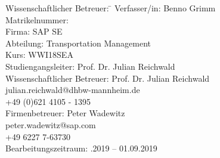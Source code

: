 \begin{titlepage}
\begin{center}
\begin{minipage}{\textwidth}
\begin{tabbing}
	Wissenschaftlicher Betreuer: \hspace{0.85cm}\=\kill
	Verfasser/in: \> Benno Grimm \\[1.5mm]
	Matrikelnummer:  \\[1.5mm]
	Firma: \> SAP SE  \\[1.5mm]
	Abteilung: \> Transportation Management \\[1.5mm]
	Kurs: \> WWI18SEA \\[1.5mm]
	Studiengangsleiter: \> Prof. Dr. Julian Reichwald  \\[1.5mm]
	Wissenschaftlicher Betreuer: \> Prof. Dr. Julian Reichwald \\
	\> julian.reichwald@dhbw-mannheim.de \\
	\> +49 (0)621 4105 - 1395 \\[1.5mm]
	Firmenbetreuer: \> Peter Wadewitz \\
	\> peter.wadewitz@sap.com \\
	\> +49 6227 7-63730 \\[1.5mm]
	Bearbeitungszeitraum: .2019 -- 01.09.2019
\end{tabbing}
\end{minipage}

\end{center}

\end{titlepage}